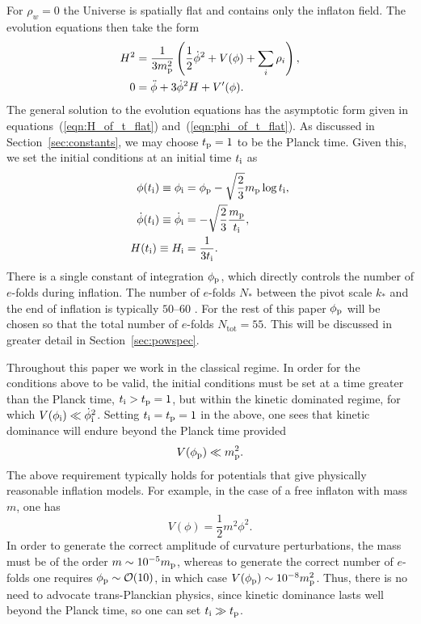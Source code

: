 For $\rho_w=0$ the Universe is spatially flat and contains only the inflaton field. The evolution equations then take the form
%
\begin{align}
  H^2 
  &= 
  \frac{1}{3m_{\mathrm{p}}^2}
  \left(\frac{1}{2}\dot{\phi}^2 + V(\phi) + \sum_i\rho_i\right),
  \label{eqn:Friedmann_eq} 
  \\
  0
  &= 
  \ddot{\phi} +3\dot{\phi}^2H + V^\prime(\phi).
  \label{eqn:Motion_eq_Scalar}
\end{align}
%
The general solution to the evolution equations has the asymptotic form given in equations~(\ref{eqn:H_of_t_flat}) and~(\ref{eqn:phi_of_t_flat}). As discussed in Section~\ref{sec:constants}, we may choose $t_{\mathrm{p}}=1$ to be the Planck time. Given this, we set the initial conditions at an initial time $t_{\mathrm{i}}$ as
%
\begin{align}
  \phi(t_{\mathrm{i}}) \equiv \phi_{\mathrm{i}}
  &= 
  \phi_{\mathrm{p}} - \sqrt{\frac{2}{3}}m_{\mathrm{p}}\log t_{\mathrm{i}}, 
  \label{eqn:phi_ic}
  \\
  \dot\phi(t_{\mathrm{i}}) 
  \equiv 
  \dot\phi_{\mathrm{i}}
  &= 
  -\sqrt{\frac{2}{3}}\frac{m_{\mathrm{p}}}{t_{\mathrm{i}}}, 
  \label{eqn:phid_ic}
  \\
  H(t_{\mathrm{i}}) 
  \equiv 
  H_{\mathrm{i}}
  &= 
  \frac{1}{3t_{\mathrm{i}}}. 
  \label{eqn:H_ic}
\end{align}
There is a single constant of integration $\phi_{\mathrm{p}}$, which directly controls the number of $e$-folds during inflation. The number of $e$-folds $N_*$ between the pivot scale $k_*$ and the end of inflation is typically $50$--$60$ \citep{planck_collaboration_planck_2013-1}. For the rest of this paper $\phi_{\mathrm{p}}$ will be chosen so that the total number of $e$-folds $N_\mathrm{tot}=55$. This will be discussed in greater detail in Section~\ref{sec:powspec}.

Throughout this paper we work in the classical regime. In order for the conditions above to be valid, the initial conditions must be set at a time greater than the Planck time, $t_{\mathrm{i}} >t_{\mathrm{p}}=1$, but within the kinetic dominated regime, for which $V(\phi_{\mathrm{i}}) \ll \dot\phi_{\mathrm{i}}^2$. Setting $t_{\mathrm{i}}=t_{\mathrm{p}}=1$ in the above, one sees that kinetic dominance will endure beyond the Planck time provided
%
\begin{equation}
  V(\phi_{\mathrm{p}}) \ll m_{\mathrm{p}}^2.
\end{equation}
%
The above requirement typically holds for potentials that give physically reasonable inflation models. For example, in the case of a free inflaton with mass $m$, one has \[ V(\phi) = \frac{1}{2}m^2 \phi^2.\] In order to generate the correct amplitude of curvature perturbations, the mass must be of the order $m\sim10^{-5}m_{\mathrm{p}}$, whereas to generate the correct number of $e$-folds one requires $\phi_{\mathrm{p}}\sim\mathcal{O}(10)$, in which case $V(\phi_{\mathrm{p}}) \sim 10^{-8} m_{\mathrm{p}}^2$.  Thus, there is no need to advocate trans-Planckian physics, since kinetic dominance lasts well beyond the Planck time, so one can set $t_{\mathrm{i}} \gg t_{\mathrm{p}}$.


